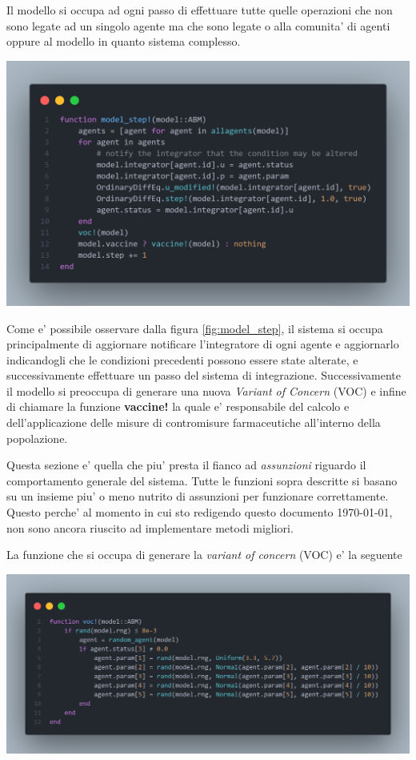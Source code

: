 Il modello si occupa ad ogni passo di effettuare tutte quelle operazioni che non sono legate ad un
singolo agente ma che sono legate o alla comunita' di agenti oppure al modello in quanto sistema complesso. 

\begin{minipage}{\linewidth}
	\centering
	\includegraphics[width=\textwidth]{img/model_step.png}
	\label{fig:model_step}
\end{minipage}

Come e' possibile osservare dalla figura \ref{fig:model_step}, il sistema si occupa principalmente
di aggiornare notificare l'integratore di ogni agente e aggiornarlo indicandogli che le condizioni
precedenti possono essere state alterate, e successivamente effettuare un passo del sistema di 
integrazione. Successivamente il modello si preoccupa di generare una nuova \emph{Variant of Concern} (VOC)
e infine di chiamare la funzione \textbf{vaccine!} la quale e' responsabile del calcolo e dell'applicazione 
delle misure di contromisure farmaceutiche all'interno della popolazione. 

Questa sezione e' quella che piu' presta il fianco ad \emph{assunzioni} riguardo 
il comportamento generale del sistema. Tutte le funzioni sopra descritte si basano su un insieme
piu' o meno nutrito di assunzioni per funzionare correttamente. Questo perche' al momento in cui sto 
redigendo questo documento \today, non sono ancora riuscito ad implementare metodi migliori. 

La funzione che si occupa di generare la \emph{variant of concern} (VOC) e' la seguente

\begin{minipage}{\linewidth}
	\centering
	\includegraphics[width=\textwidth]{img/voc.png}
	\label{fig:voc}
\end{minipage}

